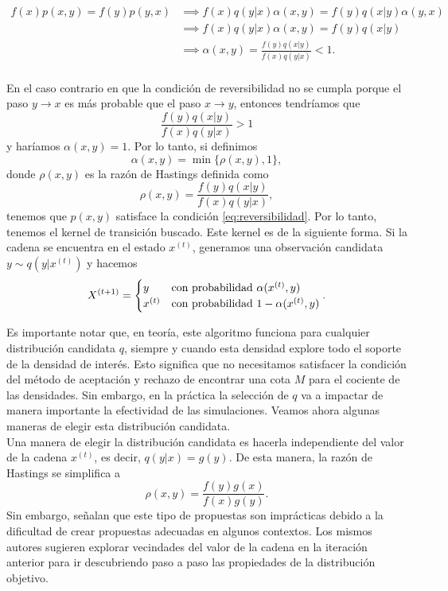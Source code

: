 \documentclass[11pt,a4paper]{article}
\begin{document}
\begin{align*}
f(x)p(x, y) = f(y) p(y, x) &\implies f(x) q(y|x) \alpha(x, y) = f(y) q(x|y)\alpha (y, x)\\
&\implies f(x) q(y|x) \alpha(x, y) = f(y) q(x|y)\\
&\implies \alpha(x, y) = \frac{f(y)q(x|y)}{f(x)q(y|x)} < 1.\\
\end{align*}

En el caso contrario en que la condición de reversibilidad no se cumpla porque el paso $y \to x$ es más probable que el paso $x \to y$, entonces tendríamos que $$\frac{f(y)q(x|y)}{f(x)q(y|x)} > 1$$ y haríamos $\alpha(x, y) = 1$. Por lo tanto, si definimos
\begin{equation}
\label{eq:prob_transicion}
\alpha(x, y) = \min \lbrace \rho(x, y), 1 \rbrace,
\end{equation}
donde $\rho(x, y)$ es la razón de Hastings definida como $$\rho(x, y) = \frac{f(y)q(x|y)}{f(x)q(y|x)},$$ tenemos que $p(x, y)$ satisface la condición \eqref{eq:reversibilidad}. Por lo tanto, tenemos el kernel de transición buscado. Este kernel es de la siguiente forma. Si la cadena se encuentra en el estado $x^{(t)}$, generamos una observación candidata $y \sim q(y|x^{(t)})$ y hacemos
\begin{equation}
\label{eq:mh}
X^{(t+1)} = \begin{cases} 
      y & \text{con probabilidad } \alpha(x^{(t)}, y)\\
      x^{(t)} & \text{con probabilidad } 1-\alpha(x^{(t)}, y)
   \end{cases}.\\
\end{equation}

Es importante notar que, en teoría, este algoritmo funciona para cualquier distribución candidata $q$, siempre y cuando esta densidad explore todo el soporte de la densidad de interés. Esto significa que no necesitamos satisfacer la condición del método de aceptación y rechazo de encontrar una cota $M$ para el cociente de las densidades. Sin embargo, en la práctica la selección de $q$ va a impactar de manera importante la efectividad de las simulaciones. Veamos ahora algunas maneras de elegir esta distribución candidata.\\

Una manera de elegir la distribución candidata es hacerla independiente del valor de la cadena $x^{(t)}$, es decir, $q(y|x) = g(y)$. De esta manera, la razón de Hastings se simplifica a $$\rho (x, y) = \frac{f(y)g(x)}{f(x)g(y)}.$$ Sin embargo, \citet{casella} señalan que este tipo de propuestas son imprácticas debido a la dificultad de crear propuestas adecuadas en algunos contextos. Los mismos autores sugieren explorar vecindades del valor de la cadena en la iteración anterior para ir descubriendo paso a paso las propiedades de la distribución objetivo.\\
\end{document}
